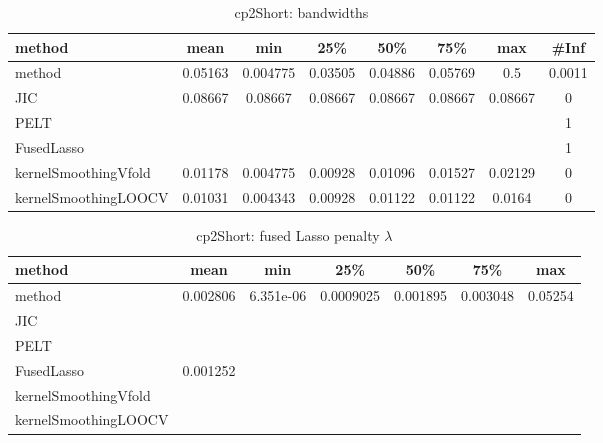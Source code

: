 \begin{table}[ht]
\centering
\begin{tabular}{l|c|ccccc|c}
  \hline
method & mean & min & 25\% & 50\% & 75\% & max & \#Inf \\ 
  \hline
method & 0.05163 & 0.004775 & 0.03505 & 0.04886 & 0.05769 &   0.5 & 0.0011 \\ 
  JIC & 0.08667 & 0.08667 & 0.08667 & 0.08667 & 0.08667 & 0.08667 &   0 \\ 
  PELT &  &  &  &  &  &  &   1 \\ 
  FusedLasso &  &  &  &  &  &  &   1 \\ 
  kernelSmoothingVfold & 0.01178 & 0.004775 & 0.00928 & 0.01096 & 0.01527 & 0.02129 &   0 \\ 
  kernelSmoothingLOOCV & 0.01031 & 0.004343 & 0.00928 & 0.01122 & 0.01122 & 0.0164 &   0 \\ 
   \hline
\end{tabular}
\caption{cp2Short: bandwidths} 
\label{tab:cp2ShortBandwidths}
\end{table}
\begin{table}[ht]
\centering
\begin{tabular}{l|c|ccccc}
  \hline
method & mean & min & 25\% & 50\% & 75\% & max \\ 
  \hline
method & 0.002806 & 6.351e-06 & 0.0009025 & 0.001895 & 0.003048 & 0.05254 \\ 
  JIC &  &  &  &  &  &  \\ 
  PELT &  &  &  &  &  &  \\ 
  FusedLasso & 0.001252 &  &  &  &  &  \\ 
  kernelSmoothingVfold &  &  &  &  &  &  \\ 
  kernelSmoothingLOOCV &  &  &  &  &  &  \\ 
   \hline
\end{tabular}
\caption{cp2Short: fused Lasso penalty $\lambda$} 
\label{tab:cp2ShortLambdas}
\end{table}
